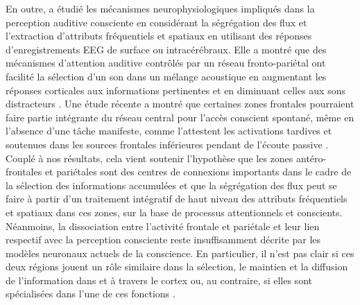 En outre, \cite{bidet2007mecanismes} a étudié les mécanismes neurophysiologiques impliqués dans la perception auditive consciente en considérant la ségrégation des flux et l'extraction d'attributs fréquentiels et spatiaux en utilisant des réponses d'enregistrements EEG de surface ou intracérébraux. 
Elle a montré que des mécanismes d'attention auditive contrôlés par un réseau fronto-pariétal ont facilité la sélection d'un son dans un mélange acoustique en augmentant les réponses corticales aux informations pertinentes et en diminuant celles aux sons distracteurs \citep{bidet2007mecanismes}. 
Une étude récente a montré que certaines zones frontales pourraient faire partie intégrante du réseau central pour l'accès conscient spontané, même en l'absence d'une tâche manifeste, comme l'attestent les activations tardives et soutenues dans les sources frontales inférieures pendant de l'écoute passive \citep{sergent2021bifurcation}.
Couplé à nos résultats, cela vient soutenir l'hypothèse que les zones antéro-frontales et pariétales sont des centres de connexions importants dans le cadre de la sélection des informations accumulées et que la ségrégation des flux peut se faire à partir d'un traitement intégratif de haut niveau des attributs fréquentiels et spatiaux dans ces zones, sur la base de processus attentionnels et conscients. 
Néanmoins, la dissociation entre l'activité frontale et pariétale et leur lien respectif avec la perception consciente reste insuffisamment décrite par les modèles neuronaux actuels de la conscience. 
En particulier, il n'est pas clair si ces deux régions jouent un rôle similaire dans la sélection, le maintien et la diffusion de l'information dans et à travers le cortex ou, au contraire, si elles sont spécialisées dans l'une de ces fonctions \citep{king2014characterizingthesis}.


